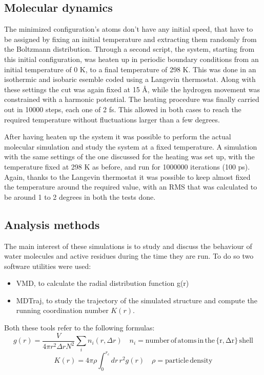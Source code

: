\documentclass[12pt]{article}
\begin{document}
\subsection{Molecular dynamics}
The minimized configuration's atoms don't have any initial speed, that have to be assigned by fixing an initial temperature and extracting them randomly from the Boltzmann distribution. Through a second script, the system, starting from this initial configuration, was heaten up in periodic boundary conditions from an initial temperature of 0 K, to a final temperature of 298 K. This was done in an isothermic and isobaric esemble coded using a Langevin thermostat. Along with these settings the cut was again fixed at 15 \AA, while the hydrogen movement was constrained with a harmonic potential.
The heating procedure was finally carried out in 10000 steps, each one of 2 fs. This allowed in both cases to reach the required temperature without fluctuations larger than a few degrees.


After having heaten up the system it was possible to perform the actual molecular simulation and study the system at a fixed temperature. A simulation with the same settings of the one discussed for the heating was set up, with the temperature fixed at 298 K as before, and run for 1000000 iterations (100 ps).
Again, thanks to the Langevin thermostat it was possible to keep almost fixed the temperature around the required value, with an RMS that was calculated to be around 1 to 2 degrees in both the tests done.

\subsection{Analysis methods}
The main interest of these simulations is to study and discuss the behaviour of water molecules and active residues during the time they are run. To do so two software utilities were used:
\begin{itemize}
    \item VMD\cite{VMD}, to calculate the radial distribution function g(r)
    \item MDTraj\cite{MDTraj}, to study the trajectory of the simulated structure and compute the running coordination number $K(r)$.
\end{itemize}

Both these tools refer to the following formulas:
\begin{equation}
    g(r) = \frac{V}{4\pi r^2 \Delta r N^2}\sum_i n_i(r,\Delta r) \quad n_i = \mathrm{number \, of \, atoms \, in \, the \, \{r,\Delta r\} \, shell}
    \label{eq:gofr}
\end{equation}
\begin{equation}
    K(r) = 4\pi \rho \int_{0}^{r_c} dr \, r^2 g(r) \quad \rho = \mathrm{particle \, density}
    \label{eq:kofr}
\end{equation}
\end{document}
